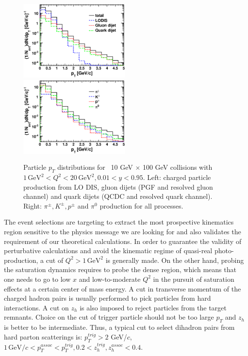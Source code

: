 \begin{figure} 
\begin{center} 
\includegraphics[width=0.495\textwidth]
{plots/chpt6/ep_10x100_Q2_1_20_y_0.01_0.95_process_ptSpectrum.eps}
\includegraphics[width=0.495\textwidth]
{plots/chpt6/ep_10x100_Q2_1_20_y_0.01_0.95_PID_ptSpectrum.eps}
\end{center} 
\caption[Process or PID dependent $p_{T}$ distribution]
{Particle $p_{T}$ distributions for \ep\ 10 GeV $\times$ 100 GeV collisions with
$1 \, \mathrm{GeV}^{2}  < Q^{2} < 20 \, \mathrm{GeV^{2}}, 0.01 < y < 0.95$. Left: charged particle production from LO DIS, gluon dijets
(PGF and resolved gluon channel) and quark dijets (QCDC and resolved quark channel).
Right: $\pi^{\pm}, K^{\pm}, p^{\pm}$ and $\pi^{0}$ production for all processes.}
\label{fig:PtSpectrum}
\end{figure}

The event selections are targeting to extract the most prospective kinematics
region sensitive to the physics message we are looking for and also validates
the requirement of our theoretical calculations. In order to guarantee the
validity of perturbative calculations and avoid the kinematic regime of
quasi-real photo-production, a cut of $Q^{2}>1 \, \mathrm{GeV}^{2}$ is generally
made. On the other hand, probing the saturation dynamics requires to probe the
dense region, which means that one needs to go to low $x$ and low-to-moderate
$Q^{2}$ in the pursuit of saturation effects at a certain center of mass energy.
A cut in transverse momentum of the charged hadron pairs is usually performed to
pick particles from hard interactions. A cut on $z_{h}$ is also imposed to
reject particles from the target remnants.
Choice on the cut of trigger particle should not be too large $p_{T}$ and $z_{h}$ is
better to be intermediate. Thus, a typical cut to select dihadron pairs from hard parton
scatterings is: $p_{T}^{trig}>2$ GeV/$c$, $1 \, \mathrm{GeV/}c
<p_{T}^{assoc}<p_{T}^{trig}, 0.2<z_{h}^{trig},z_{h}^{assoc}<0.4$.

